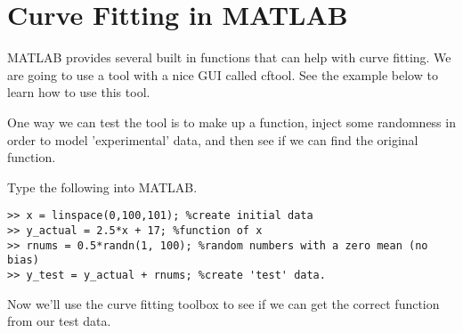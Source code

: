 \documentclass[paper=a4, fontsize=11pt]{scrartcl} %
\numberwithin{equation}{section} %
\numberwithin{figure}{section} %
\numberwithin{table}{section} %
\begin{document}
\section{Curve Fitting in MATLAB}
MATLAB provides several built in functions that can help with curve fitting.
We are going to use a tool with a nice GUI called cftool.
See the example below to learn how to use this tool.

One way we can test the tool is to make up a function, inject some randomness in order to model 'experimental' data, and then see if we can find the original function.

Type the following into MATLAB.
\begin{verbatim}
>> x = linspace(0,100,101); %create initial data
>> y_actual = 2.5*x + 17; %function of x
>> rnums = 0.5*randn(1, 100); %random numbers with a zero mean (no bias)
>> y_test = y_actual + rnums; %create 'test' data.
\end{verbatim}

Now we'll use the curve fitting toolbox to see if we can get the correct function from our test data.
\end{document}
